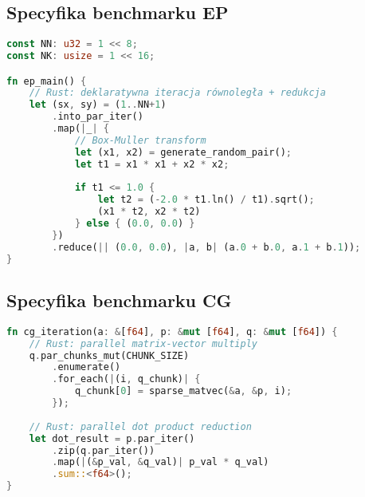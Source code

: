 \subsection{Specyfika benchmarku EP}
\begin{lstlisting}[language=Rust, caption={Implementacja benchmarku EP w języku Rust}, label={lst:ep_rust}]
const NN: u32 = 1 << 8;
const NK: usize = 1 << 16;

fn ep_main() {
    // Rust: deklaratywna iteracja równoległa + redukcja
    let (sx, sy) = (1..NN+1)
        .into_par_iter()
        .map(|_| {
            // Box-Muller transform
            let (x1, x2) = generate_random_pair();
            let t1 = x1 * x1 + x2 * x2;
            
            if t1 <= 1.0 {
                let t2 = (-2.0 * t1.ln() / t1).sqrt();
                (x1 * t2, x2 * t2)
            } else { (0.0, 0.0) }
        })
        .reduce(|| (0.0, 0.0), |a, b| (a.0 + b.0, a.1 + b.1));
}
\end{lstlisting}

\subsection{Specyfika benchmarku CG}
\begin{lstlisting}[language=Rust, caption={Implementacja benchmarku CG w języku Rust}, label={lst:cg_rust}]
fn cg_iteration(a: &[f64], p: &mut [f64], q: &mut [f64]) {
    // Rust: parallel matrix-vector multiply
    q.par_chunks_mut(CHUNK_SIZE)
        .enumerate()
        .for_each(|(i, q_chunk)| {
            q_chunk[0] = sparse_matvec(&a, &p, i);
        });
    
    // Rust: parallel dot product reduction
    let dot_result = p.par_iter()
        .zip(q.par_iter())
        .map(|(&p_val, &q_val)| p_val * q_val)
        .sum::<f64>();
}
\end{lstlisting}
  
